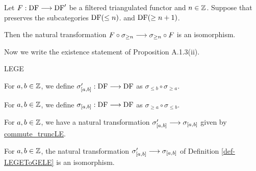 \begin{proposition}
\label{prop-commute_truncGE_iso}
\leanok
{}

Let $F:\operatorname{DF}\longrightarrow\operatorname{DF}'$ be a filtered triangulated functor
and $n\in\mathbb{Z}$. Suppose that preserves the subcategories $\operatorname{DF}(\le n)$.
and $\operatorname{DF}(\ge n + 1)$.

Then the natural transformation
$F \circ\sigma_{\ge n} \longrightarrow \sigma_{\ge n} \circ F$ is an isomorphism.

\end{proposition}

Now we write the existence statement of Proposition A.1.3(ii).

\begin{definition}
\label{def-truncLEGE}
\leanok
{}LEGE

For $a,b\in\mathbb{Z}$, we define $\sigma'_{[a,b]} : \operatorname{DF}\longrightarrow\operatorname{DF}$ as $\sigma_{\leq b}\circ\sigma_{\geq a}$.

\end{definition}

\begin{definition}
\label{def-truncGELE}
\leanok
{}

For $a,b\in\mathbb{Z}$, we define $\sigma_{[a,b]} : \operatorname{DF}\longrightarrow\operatorname{DF}$ as $\sigma_{\geq a}\circ\sigma_{\leq b}$.

\end{definition}

\begin{definition}
\label{def-LEGEToGELE}
\leanok
{}

For $a,b\in\mathbb{Z}$, we have a natural transformation $\sigma'_{[a,b]} \longrightarrow\sigma_{[a,b]}$ given by \url{commute_truncLE}.

\end{definition}

\begin{definition}
\label{def-LEGEToGELE_iso}
\leanok
{}

For $a,b\in\mathbb{Z}$, the natural transformation $\sigma'_{[a,b]} \longrightarrow\sigma_{[a,b]}$ of Definition \ref{def-LEGEToGELE} is an isomorphism.

\end{definition}


